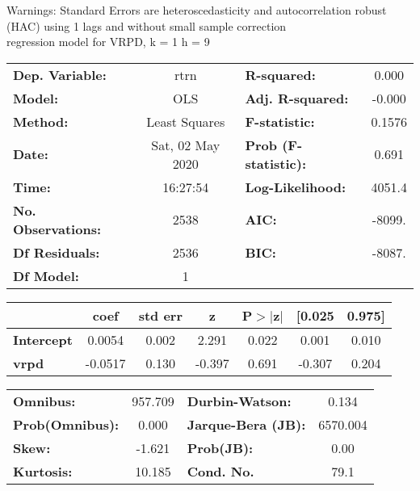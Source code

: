 Warnings: \newline
 [1] Standard Errors are heteroscedasticity and autocorrelation robust (HAC) using 1 lags and without small sample correction\\ 

regression model for VRPD, k = 1 h = 9\begin{center}
\begin{tabular}{lclc}
\toprule
\textbf{Dep. Variable:}    &       rtrn       & \textbf{  R-squared:         } &     0.000   \\
\textbf{Model:}            &       OLS        & \textbf{  Adj. R-squared:    } &    -0.000   \\
\textbf{Method:}           &  Least Squares   & \textbf{  F-statistic:       } &    0.1576   \\
\textbf{Date:}             & Sat, 02 May 2020 & \textbf{  Prob (F-statistic):} &    0.691    \\
\textbf{Time:}             &     16:27:54     & \textbf{  Log-Likelihood:    } &    4051.4   \\
\textbf{No. Observations:} &        2538      & \textbf{  AIC:               } &    -8099.   \\
\textbf{Df Residuals:}     &        2536      & \textbf{  BIC:               } &    -8087.   \\
\textbf{Df Model:}         &           1      & \textbf{                     } &             \\
\bottomrule
\end{tabular}
\begin{tabular}{lcccccc}
                   & \textbf{coef} & \textbf{std err} & \textbf{z} & \textbf{P$> |$z$|$} & \textbf{[0.025} & \textbf{0.975]}  \\
\midrule
\textbf{Intercept} &       0.0054  &        0.002     &     2.291  &         0.022        &        0.001    &        0.010     \\
\textbf{vrpd}      &      -0.0517  &        0.130     &    -0.397  &         0.691        &       -0.307    &        0.204     \\
\bottomrule
\end{tabular}
\begin{tabular}{lclc}
\textbf{Omnibus:}       & 957.709 & \textbf{  Durbin-Watson:     } &    0.134  \\
\textbf{Prob(Omnibus):} &   0.000 & \textbf{  Jarque-Bera (JB):  } & 6570.004  \\
\textbf{Skew:}          &  -1.621 & \textbf{  Prob(JB):          } &     0.00  \\
\textbf{Kurtosis:}      &  10.185 & \textbf{  Cond. No.          } &     79.1  \\
\bottomrule
\end{tabular}
\end{center}

